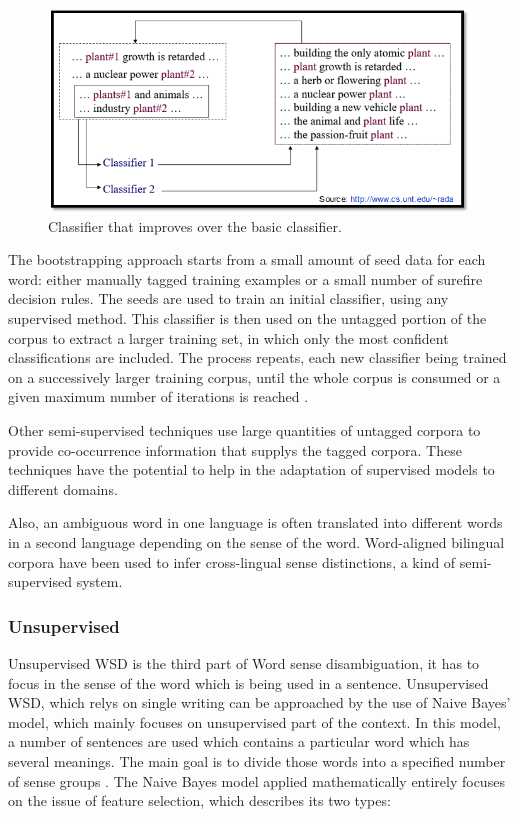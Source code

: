\begin{figure}[tbh]
	\begin{center}
		\includegraphics[width=\columnwidth]{Union_Background_Chart_semi}
	\end{center}
	\caption{Classifier that improves over the basic classifier. \label{fig3}}
\end{figure}

The bootstrapping approach starts from a small amount of seed data for each word: either manually tagged training examples or a small number of surefire decision rules. The seeds are used to train an initial classifier, using any supervised method. This classifier is then used on the untagged portion of the corpus to extract a larger training set, in which only the most confident classifications are included. 
The process repeats, each new classifier being trained on a successively larger training corpus, until the whole corpus is consumed or a given maximum number of iterations is reached \cite{Blascheck2016}.

Other semi-supervised techniques use large quantities of untagged corpora to provide co-occurrence information that supplys the tagged corpora. These techniques have the potential to help in the adaptation of supervised models to different domains.

Also, an ambiguous word in one language is often translated into different words in a second language depending on the sense of the word. Word-aligned bilingual corpora have been used to infer cross-lingual sense distinctions, a kind of semi-supervised system.\cite{Cheslow2014}

\subsubsection*{Unsupervised}
Unsupervised WSD is the third part of Word sense disambiguation, it has to focus in the sense of the word which is being used in a sentence. Unsupervised WSD, which relys on single writing can be approached by the use of Naive Bayes' model, which mainly focuses on unsupervised part of the context. In this model, a number of sentences are used which contains a particular word which has several meanings. 
The main goal is to divide those words into a specified number of sense groups \cite{4028513}. The Naive Bayes model applied mathematically entirely focuses on the issue of feature selection, which describes its two types:

